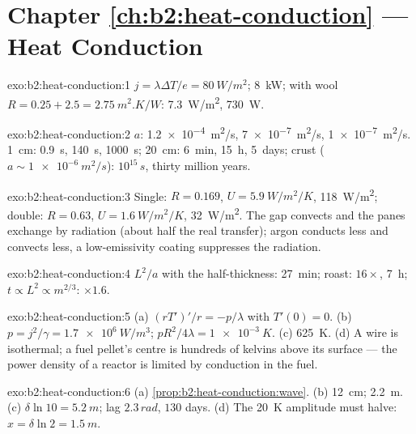 \section*{Chapter \ref{ch:b2:heat-conduction} --- Heat Conduction}

\begin{solution}{exo:b2:heat-conduction:1}
$j = \lambda\Delta T/e = \qty{80}{W/m^2}$; \qty{8}{kW}; with wool $R = 0.25 + 2.5 =
\qty{2.75}{m^2.K/W}$: \qty{7.3}{W/m^2}, \qty{730}{W}.
\end{solution}

\begin{solution}{exo:b2:heat-conduction:2}
$a$: \qty{1.2e-4}{m^2/s}, \qty{7e-7}{m^2/s}, \qty{1e-7}{m^2/s}. \qty{1}{cm}:
\qty{0.9}{s}, \qty{140}{s}, \qty{1000}{s}; \qty{20}{cm}: \qty{6}{min}, \qty{15}{h},
\qty{5}{days}; crust ($a \sim \qty{1e-6}{m^2/s}$): $10^{15}\,\unit{s}$, thirty
million years.
\end{solution}

\begin{solution}{exo:b2:heat-conduction:3}
Single: $R = 0.169$, $U = \qty{5.9}{W/m^2/K}$, \qty{118}{W/m^2}; double: $R =
0.63$, $U = \qty{1.6}{W/m^2/K}$, \qty{32}{W/m^2}. The gap convects and the panes
exchange by radiation (about half the real transfer); argon conducts
less and convects less, a low-emissivity coating suppresses the
radiation.
\end{solution}

\begin{solution}{exo:b2:heat-conduction:4}
$L^2/a$ with the half-thickness: \qty{27}{min}; roast: $16\times$, \qty{7}{h};
$t \propto L^2 \propto m^{2/3}$: $\times 1.6$.
\end{solution}

\begin{solution}{exo:b2:heat-conduction:5}
(a) $(rT')'/r = -p/\lambda$ with $T'(0) = 0$. (b) $p = j^2/\gamma = \qty{1.7e6}{W/m^3}$;
$pR^2/4\lambda = \qty{1e-3}{K}$. (c) \qty{625}{K}. (d) A wire is isothermal; a fuel
pellet's centre is hundreds of kelvins above its surface --- the power
density of a reactor is limited by conduction in the fuel.
\end{solution}

\begin{solution}{exo:b2:heat-conduction:6}
(a) \cref{prop:b2:heat-conduction:wave}. (b) \qty{12}{cm}; \qty{2.2}{m}. (c)
$\delta\ln 10 = \qty{5.2}{m}$; lag $2.3\,\unit{rad}$, $130$ days. (d) The
\qty{20}{K} amplitude must halve: $x = \delta\ln 2 = \qty{1.5}{m}$.
\end{solution}

